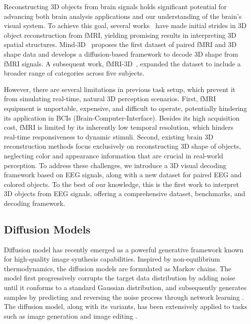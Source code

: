 Reconstructing 3D objects from brain signals holds significant potential for advancing both brain analysis applications and our understanding of the brain’s visual system. To achieve this goal, several works~\cite{gao2023mind,fMRI-3D} have made initial strides in 3D object reconstruction from fMRI, yielding promising results in interpreting 3D spatial structures. 
Mind-3D~\cite{gao2023mind} proposes the first dataset of paired fMRI and 3D shape data and develops a diffusion-based framework to decode 3D shape from fMRI signals. A subsequent work, fMRI-3D~\cite{fMRI-3D}, expanded the dataset to include a broader range of categories across five subjects. 

However, there are several limitations in previous task setup, which prevent it from simulating real-time, natural 3D perception scenarios. First, fMRI equipment is unportable, expensive, and difficult to operate, potentially hindering its application in BCIs (Brain-Computer-Interface). Besides its high acquisition cost, fMRI is limited by its inherently low temporal resolution, which hinders real-time responsiveness to dynamic stimuli. Second, existing brain 3D reconstruction methods focus exclusively on reconstructing 3D shape of objects, neglecting color and appearance information that are crucial in real-world perception.
To address these challenges, 
we introduce a 3D visual decoding framework based on EEG signals, along with 
a new dataset for paired EEG and colored objects. 
To the best of our knowledge, this is the first work to interpret 3D objects from EEG signals, offering a comprehensive dataset, benchmarks, and decoding framework.


\vspace{-1mm}
\subsection{Diffusion Models}



Diffusion model has recently emerged as a powerful generative framework known for high-quality image synthesis capabilities. Inspired by non-equilibrium thermodynamics, the diffusion models are formulated as Markov chains. The model first progressively corrupts the target data distribution by adding noise until it conforms to a standard Gaussian distribution, and subsequently generates samples by predicting and reversing the noise process through network learning \cite{ho2020denoising,nichol2021improved}. The diffusion model, along with its variants, has been extensively applied to tasks such as image generation \cite{rombach2022high,kim2022diffusionclip,saharia2022photorealistic,ramesh2021zero} and image editing \cite{yu2024accelerating,zhang2023adding}.


